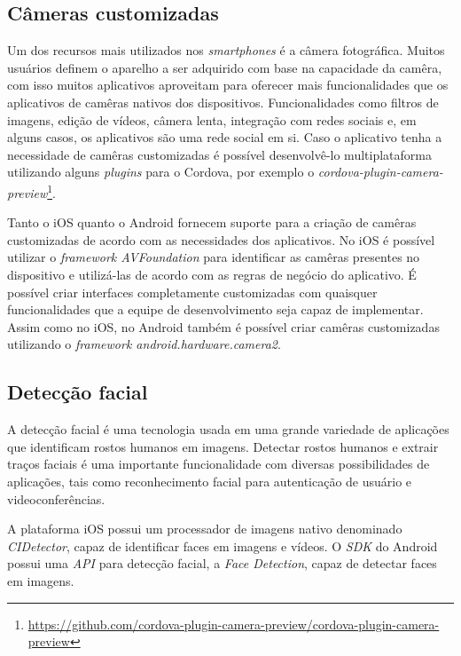 \subsection{Câmeras customizadas} \label{subsec:customcamera}

Um dos recursos mais utilizados nos \textit{smartphones} é a câmera fotográfica. Muitos usuários definem o aparelho a ser adquirido com base na capacidade da camêra, com isso muitos aplicativos aproveitam para 
oferecer mais funcionalidades que os aplicativos de camêras nativos dos dispositivos. Funcionalidades como filtros de imagens, edição de vídeos, câmera lenta, integração com redes sociais e, em alguns casos, os aplicativos 
são uma rede social em si. Caso o aplicativo tenha a necessidade de camêras customizadas é possível desenvolvê-lo multiplataforma utilizando alguns \textit{plugins} para o Cordova, por exemplo o 
\textit{cordova-plugin-camera-preview}\footnote{\url{https://github.com/cordova-plugin-camera-preview/cordova-plugin-camera-preview}}.

Tanto o iOS quanto o Android fornecem suporte para a criação de camêras customizadas de acordo com as necessidades dos aplicativos. No iOS é possível utilizar o \textit{framework AVFoundation} para identificar as camêras 
presentes no dispositivo e utilizá-las de acordo com as regras de negócio do aplicativo. É possível criar interfaces completamente customizadas com quaisquer funcionalidades que a equipe de desenvolvimento seja capaz de 
implementar. Assim como no iOS, no Android também é possível criar camêras customizadas utilizando o \textit{framework android.hardware.camera2}.

\subsection{Detecção facial} \label{subsec:facial}
A detecção facial é uma tecnologia usada em uma grande variedade de aplicações que identificam rostos humanos em imagens. Detectar rostos humanos e extrair traços faciais é uma importante funcionalidade com diversas 
possibilidades de aplicações, tais como reconhecimento facial para autenticação de usuário e videoconferências. %

A plataforma iOS possui um processador de imagens nativo denominado \textit{CIDetector}, capaz de identificar faces em imagens e vídeos. O \textit{SDK} do Android possui uma \textit{API} para detecção facial, 
a \textit{Face Detection}, capaz de detectar faces em imagens.


